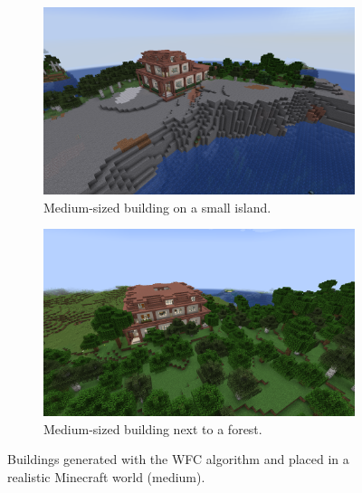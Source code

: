 \documentclass[
oneside,
fontsize=11pt
]{scrartcl}
\begin{document}
\begin{figure}[ht]
  \centering
  \begin{subfigure}[t]{0.48\textwidth}
    \includegraphics[width=\textwidth]{images/end2end/generated_medium_building_on_island.png}
    \caption{Medium-sized building on a small island.}
  \end{subfigure}
  \hfill
  \begin{subfigure}[t]{0.48\textwidth}
    \includegraphics[width=\textwidth]{images/end2end/generated_medum_building_next_to_forest.png}
    \caption{Medium-sized building next to a forest.}
  \end{subfigure}
  \caption{Buildings generated with the WFC algorithm and placed in a realistic Minecraft world (medium).}
  \label{fig_generated_medium_building_real_world_medium}
\end{figure}
\end{document}
